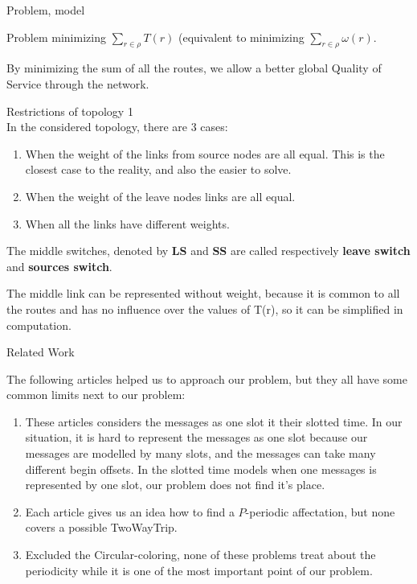 \documentclass[a4paper,10pt]{report}
\begin{document}
\begin{chapter}{Problem, model}
\begin{section}{Problem}
 minimizing $\sum_{r \in \rho}  T(r)$ (equivalent to minimizing $\sum_{r \in \rho}  \omega(r)$.

By minimizing the sum of all the routes, we allow a better global Quality of Service through the network.\\
\begin{subsection}{Restrictions of topology 1}
\\


In the considered topology, there are 3 cases:
\begin{enumerate}
 \item When the weight of the links from source nodes are all equal. This is the closest case to the reality, and also the easier to solve.
 \item When the weight of the leave nodes links are all equal.
 \item When all the links have different weights.
\end{enumerate}

The middle switches, denoted by {\bf LS} and {\bf SS} are called respectively {\bf leave switch} and {\bf sources switch}.

The middle link can be represented without weight, because it is common to all the routes and has no influence over the values of T(r), so it can be simplified in computation. 

\end{subsection}
\end{section}
\begin{section}{Related Work}

The following articles helped us to approach our problem, but they all have some common limits next to our problem:
\begin{enumerate}
 \item These articles considers the messages as one slot it their slotted time. In our situation, it is hard to represent the messages as one slot because our messages are modelled by many slots, and the messages can take many different begin offsets. In the slotted time models when one messages is represented by one slot, our problem does not find it's place.
 \item Each article gives us an idea how to find a $P$-periodic affectation, but none covers a possible TwoWayTrip. 
 \item Excluded the Circular-coloring, none of these problems treat about the periodicity while it is one of the most important point of our problem.
 

\end{enumerate}
\end{section}
\end{chapter}
\end{document}
